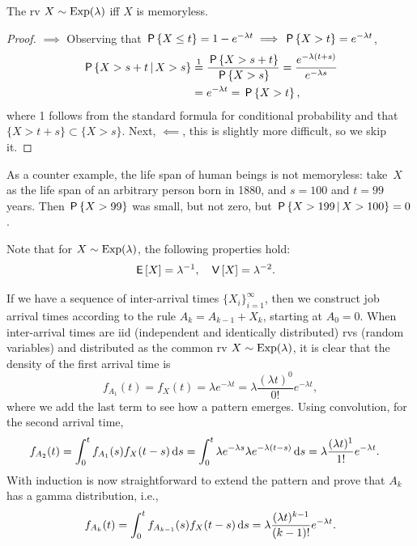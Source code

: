 \documentclass[queueing-book.tex]{subfiles}
\begin{document}
\begin{theorem}
The rv $X\sim \Exp{\lambda}$ iff $X$ is memoryless.
\end{theorem}
\begin{proof}
$\implies$ Observing that $\P{X \leq t} = 1- e^{-\lambda t} \implies \P{X>t} = e^{-\lambda t}$,
\begin{align*}
 \P{X > s+t \given X>s} &\stackrel1= \frac{\P{X>s+t}}{\P{X>s}} = \frac{e^{-\lambda(t+s)}}{e^{-\lambda s}} \\
  &= e^{-\lambda t} =\P{X>t},
\end{align*}
where 1 follows from the standard formula for conditional probability and that $\{X>t+s\} \subset \{X>s\}$.
Next, $\impliedby$,  this is slightly more difficult, so we skip it. 
\end{proof}

As a counter example, the life span of human beings is not memoryless: take~$X$ as the life span of an arbitrary person born in 1880, and $s= 100$ and $t = 99$ years.
Then $\P{X>99}$ was small, but not zero, but $\P{X>199 \given X>100} = 0$.

Note that for $X\sim \Exp{\lambda}$, the following properties hold:
  \begin{align*}
  \E X &= \lambda^{-1},  &
\V X &= \lambda^{-2}.
\end{align*}

If we have a sequence of inter-arrival times $\{X_{i}\}_{i=1}^{\infty}$, then we construct job arrival times according to the rule $A_{k} = A_{k-1} + X_{k}$, starting at $A_{0} = 0$.
When inter-arrival times are iid (independent and identically distributed) rvs (random variables) and distributed as the common rv $X\sim \Exp{\lambda}$, it is clear that the density of the first arrival time is
\begin{equation*}
 f_{A_{1}}(t) = f_{X} (t) = \lambda e^{-\lambda t} = \lambda \frac{(\lambda t)^{0}}{0!} e^{-\lambda t},
\end{equation*}
where we add the last term to see how a pattern emerges.
Using convolution, for the second arrival time,
\begin{align*}
  f_{A_{2}}(t) &=\int_{0}^{t} f_{A_1}(s) f_{X}(t-s)\d s = \int_{0}^{t} \lambda e^{-\lambda s} \lambda e^{-\lambda(t-s)}\d s = \lambda \frac{(\lambda t)^1}{1!} e^{-\lambda t}.
\end{align*}
With induction  is now straightforward to extend the pattern and prove that $A_{k}$ has a gamma distribution, i.e.,
\begin{equation}\label{eq:e-37}
f_{A_k}(t) = \int_{0}^{t}f_{A_{k-1}}(s) f_X(t-s)\d s = \lambda \frac{(\lambda t)^{k-1}}{(k-1)!} e^{-\lambda t}.
\end{equation}
\end{document}
